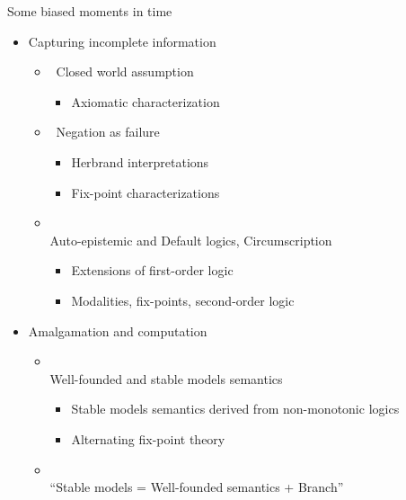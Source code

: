 \begin{frame}{Some biased moments in time}
  \begin{itemize}
  \item<1-> Capturing incomplete information
    \begin{itemize}
    \item<only@2->  \
Closed world assumption
      \begin{itemize}
      \item<only@3-5> Axiomatic characterization %
      \end{itemize}
    \item<only@2->  \ Negation as failure
      \begin{itemize}
      \item<only@4-5> Herbrand interpretations
      \item<only@4-5> Fix-point characterizations
      \end{itemize}
    \item<only@2-> \\ Auto-epistemic and Default logics, Circumscription
      \begin{itemize}
      \item<only@5-5> Extensions of first-order logic
      \item<only@5-5> Modalities, fix-points, second-order logic
      \end{itemize}
    \end{itemize}
  \item<only@6-> Amalgamation and computation
    \begin{itemize}
    \item<only@7-> \\ Well-founded and stable models semantics
      \begin{itemize}
      \item<only@8-9> Stable models semantics derived from non-monotonic logics
      \item<only@8-9> Alternating fix-point theory
      \end{itemize}
    \item<only@7-> \\ ``Stable models = Well-founded semantics + Branch''

\end{itemize}
\end{itemize}
\end{frame}
